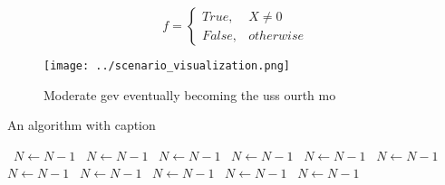 \documentclass[a4paper]{article}
\begin{document}
\begin{equation}   f =
\begin{cases} True, & X \neq 0\\
False, & otherwise
\end{cases}
\end{equation}

\begin{figure}
\centering
\texttt{[image: ../scenario\_visualization.png]}
\caption{Moderate gev eventually becoming the uss ourth mo
}
\end{figure}
 
\begin{algorithm}
\caption{An algorithm with caption}
\begin{algorithmic}
\    \State $N \gets N - 1$
\    \State $N \gets N - 1$
\    \State $N \gets N - 1$
\    \State $N \gets N - 1$
\    \State $N \gets N - 1$
\    \State $N \gets N - 1$
\    \State $N \gets N - 1$
\    \State $N \gets N - 1$
\    \State $N \gets N - 1$
\    \State $N \gets N - 1$
\    \State $N \gets N - 1$
\EndWhile
\end{algorithmic}
\end{algorithm}
\end{document}
